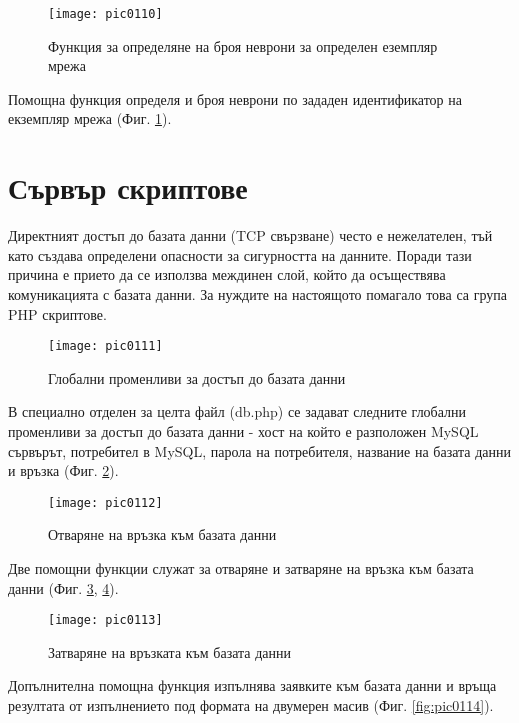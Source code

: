 \begin{figure}[h]
  \centering
  \texttt{[image: pic0110]}
  \caption{Функция за определяне на броя неврони за определен еземпляр мрежа}
\label{fig:pic0110}
\end{figure}
\FloatBarrier

Помощна функция определя и броя неврони по зададен идентификатор на екземпляр мрежа (Фиг. \ref{fig:pic0110}).

\section{Сървър скриптове}

Директният достъп до базата данни (TCP свързване) често е нежелателен, тъй като създава определени опасности за сигурността на данните. Поради тази причина е прието да се използва междинен слой, който да осъществява комуникацията с базата данни. За нуждите на настоящото помагало това са група PHP скриптове. 

\begin{figure}[h]
  \centering
  \texttt{[image: pic0111]}
  \caption{Глобални променливи за достъп до базата данни}
\label{fig:pic0111}
\end{figure}
\FloatBarrier

В специално отделен за целта файл (db.php) се задават следните глобални променливи за достъп до базата данни - хост на който е разположен MySQL сървърът, потребител в MySQL, парола на потребителя, название на базата данни и връзка (Фиг. \ref{fig:pic0111}).

\begin{figure}[h]
  \centering
  \texttt{[image: pic0112]}
  \caption{Отваряне на връзка към базата данни}
\label{fig:pic0112}
\end{figure}
\FloatBarrier

Две помощни функции служат за отваряне и затваряне на връзка към базата данни (Фиг. \ref{fig:pic0112}, \ref{fig:pic0113}).

\begin{figure}[h]
  \centering
  \texttt{[image: pic0113]}
  \caption{Затваряне на връзката към базата данни}
\label{fig:pic0113}
\end{figure}
\FloatBarrier

Допълнителна помощна функция изпълнява заявките към базата данни и връща резултата от изпълнението под формата на двумерен масив (Фиг. \ref{fig:pic0114}).

